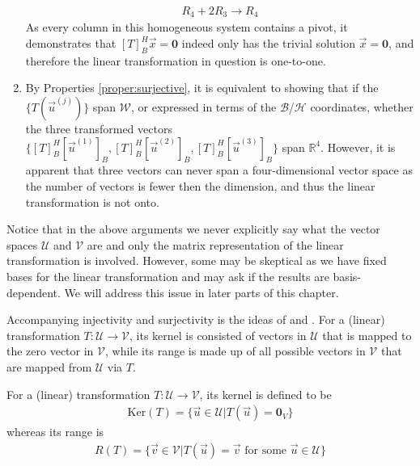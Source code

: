 \begin{solution}
\begin{enumerate}[label=(\alph*)]
\begin{align*}
    R_4 + 2R_3 \to R_4
    \end{align*}
    As every column in this homogeneous system contains a pivot, it demonstrates that $[T]_B^H\vec{x} = \textbf{0}$ indeed only has the trivial solution $\vec{x} = \textbf{0}$, and therefore the linear transformation in question is one-to-one.
    \item By Properties \ref{proper:surjective}, it is equivalent to showing that if the $\{T(\vec{u}^{(j)})\}$ span $\mathcal{W}$, or expressed in terms of the $\mathcal{B}$/$\mathcal{H}$ coordinates, whether the three transformed vectors $\{[T]_B^H[\vec{u}^{(1)}]_B, [T]_B^H[\vec{u}^{(2)}]_B, [T]_B^H[\vec{u}^{(3)}]_B\}$ span $\mathbb{R}^4$. However, it is apparent that three vectors can never span a four-dimensional vector space as the number of vectors is fewer then the dimension, and thus the linear transformation is not onto.
\end{enumerate}
Notice that in the above arguments we never explicitly say what the vector spaces $\mathcal{U}$ and $\mathcal{V}$ are and only the matrix representation of the linear transformation is involved. However, some may be skeptical as we have fixed bases for the linear transformation and may ask if the results are basis-dependent. We will address this issue in later parts of this chapter.
\end{solution}
Accompanying injectivity and surjectivity is the ideas of  and . For a (linear) transformation $T: \mathcal{U} \to \mathcal{V}$, its kernel is consisted of vectors in $\mathcal{U}$ that is mapped to the zero vector in $\mathcal{V}$, while its range is made up of all possible vectors in $\mathcal{V}$ that are mapped from $\mathcal{U}$ via $T$.
\begin{defn}
\label{defn:kernelrange}
For a (linear) transformation $T: \mathcal{U} \to \mathcal{V}$, its kernel is defined to be
\begin{align*}
\text{Ker}(T) = \{\vec{u} \in \mathcal{U} | T(\vec{u}) = \textbf{0}_V\}
\end{align*}
whereas its range is
\begin{align*}
R(T) = \{\vec{v} \in \mathcal{V} | T(\vec{u}) = \vec{v} \text{ for some } \vec{u} \in \mathcal{U}\}    
\end{align*}
\end{defn}
